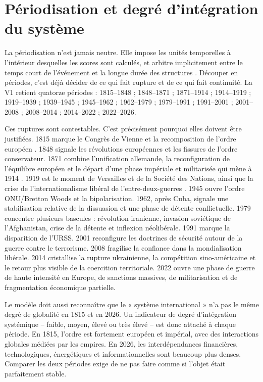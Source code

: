 \documentclass[11pt,a4paper]{article}
\begin{document}
\section{Périodisation et degré d'intégration du système}

La périodisation n'est jamais neutre. Elle impose les unités temporelles à l'intérieur desquelles les scores sont calculés, et arbitre implicitement entre le temps court de l'événement et la longue durée des structures \citep{braudel1958longue}. Découper en périodes, c'est déjà décider de ce qui fait rupture et de ce qui fait continuité. La V1 retient quatorze périodes : 1815--1848 ; 1848--1871 ; 1871--1914 ; 1914--1919 ; 1919--1939 ; 1939--1945 ; 1945--1962 ; 1962--1979 ; 1979--1991 ; 1991--2001 ; 2001--2008 ; 2008--2014 ; 2014--2022 ; 2022--2026.

Ces ruptures sont contestables. C'est précisément pourquoi elles doivent être justifiées. 1815 marque le Congrès de Vienne et la recomposition de l'ordre européen \citep{schroeder1994transformation,kissinger1957world}. 1848 signale les révolutions européennes et les fissures de l'ordre conservateur. 1871 combine l'unification allemande, la reconfiguration de l'équilibre européen et le départ d'une phase impériale et militarisée qui mène à 1914 \citep{kennedy1987rise,clark2012sleepwalkers}. 1919 est le moment de Versailles et de la Société des Nations, ainsi que la crise de l'internationalisme libéral de l'entre-deux-guerres \citep{carr1939twenty,macmillan2001paris,tooze2014deluge}. 1945 ouvre l'ordre ONU/Bretton Woods et la bipolarisation. 1962, après Cuba, signale une stabilisation relative de la dissuasion et une phase de détente conflictuelle. 1979 concentre plusieurs bascules : révolution iranienne, invasion soviétique de l'Afghanistan, crise de la détente et inflexion néolibérale. 1991 marque la disparition de l'URSS. 2001 reconfigure les doctrines de sécurité autour de la guerre contre le terrorisme. 2008 fragilise la confiance dans la mondialisation libérale. 2014 cristallise la rupture ukrainienne, la compétition sino-américaine et le retour plus visible de la coercition territoriale. 2022 ouvre une phase de guerre de haute intensité en Europe, de sanctions massives, de militarisation et de fragmentation économique partielle.

Le modèle doit aussi reconnaître que le « système international » n'a pas le même degré de globalité en 1815 et en 2026. Un indicateur de degré d'intégration systémique -- faible, moyen, élevé ou très élevé -- est donc attaché à chaque période. En 1815, l'ordre est fortement européen et impérial, avec des interactions globales médiées par les empires. En 2026, les interdépendances financières, technologiques, énergétiques et informationnelles sont beaucoup plus denses. Comparer les deux périodes exige de ne pas faire comme si l'objet était parfaitement stable.
\end{document}
